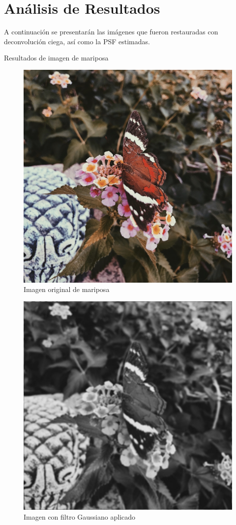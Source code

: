 \documentclass[eng]{ajceam-class}
\begin{document}
\textbf{}




\section{Análisis de Resultados}
A continuación se presentarán las imágenes que fueron restauradas con deconvolución ciega, así como la PSF estimadas. 

Resultados de imagen de mariposa

\begin{figure}[!h] 
 \centering
 \includegraphics[width=.7\columnwidth]{mariposa.jpeg} 
 \caption{Imagen original de mariposa} \label{fig-1}
\end{figure}

\begin{figure}[!h] 
 \centering
 \includegraphics[width=.7\columnwidth]{mariposaBlur.jpeg} 
 \caption{Imagen con filtro Gaussiano aplicado} \label{fig-1}
\end{figure}
\end{document}
